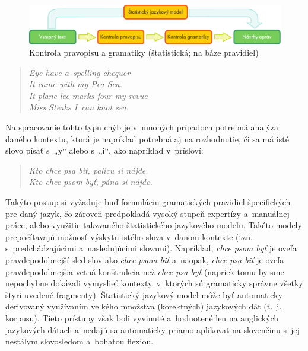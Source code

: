 \begin{multicols}{2}
\begin{figure}[htb]
  \center
  \includegraphics[width=\textwidth]{../_media/slovak/language_checking}
  \caption{Kontrola pravopisu a gramatiky (štatistická; na báze pravidiel)}
  \label{fig:langcheckingaarch_sk}
\end{figure}

\begin{verse}
\emph{%
Eye have a~spelling chequer\\
It came with my Pea Sea.\\
It plane lee marks four my revue\\
Miss Steaks I~can knot sea.
}
\end{verse}

Na spracovanie tohto typu chýb je v~mnohých prípadoch potrebná analýza daného kontextu, ktorá je napríklad potrebná aj na rozhodnutie, či sa má isté slovo písať s~„y“ alebo s~„i“, ako napríklad v~prísloví:

\begin{verse}
\emph{%
Kto chce psa biť, palicu si nájde.\\
\smallskip
Kto chce psom byť, pána si nájde.
}
\end{verse}

Takýto postup si vyžaduje buď formuláciu gramatických
pravidiel špecifických pre daný jazyk, čo zároveň predpokladá
vysoký stupeň expertízy a~manuálnej práce, alebo využitie
takzvaného štatistického jazykového modelu. Takéto
modely prepočítavajú možnosť výskytu istého slova v~danom kontexte
(tzn. s~predchádzajúcimi a~nasledujúcimi slovami). Napríklad,
\emph{chce psom byť} je oveľa pravdepodobnejší sled slov ako
\emph{chce psom biť} a~naopak, \emph{chce psa biť} je oveľa
pravdepodobnejšia vetná konštrukcia než \emph{chce psa byť}
(napriek tomu by sme nepochybne dokázali vymyslieť kontexty,
v~ktorých sú gramaticky správne všetky štyri uvedené fragmenty).
Štatistický jazykový model môže byť automaticky derivovaný
využívaním veľkého množstva (korektných) jazykových dát (t.~j.
korpusu). Tieto prístupy však boli vyvinuté a~hodnotené
len na anglických jazykových dátach a~nedajú sa automaticky priamo
aplikovať na slovenčinu s~jej nestálym slovosledom a~bohatou flexiou.


\end{multicols}
